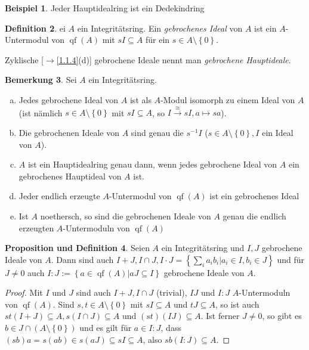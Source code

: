 \documentclass[
twoside=semi,
fontsize=12,
DIV=12, 
cleardoublepage=current,
leqno,
headings=optiontoheadandtoc, 
toc=idx
]{scrbook}
\newcommand{\set}[1]{\left\{ #1 \right\}}
\DeclareMathOperator{\qf}{qf}
\theoremstyle{definition}
\newtheorem{definition}{Definition}[section]
\newtheorem{bemerkung}[definition]{Bemerkung}
\newtheorem{beispiel}[definition]{Beispiel}
\newtheorem{prop-def}[definition]{Proposition und Definition}
\begin{document}
 	\begin{beispiel}\label{2.2.5}
 		Jeder Hauptidealring ist ein Dedekindring
 	\end{beispiel}
 
 	\begin{definition}\label{2.2.6}
 		ei $A$ ein Integrit\"atsring. Ein \emph{gebrochenes Ideal} von $A$ ist ein $A$-Untermodul von $\qf(A)$ mit $sI \subseteq A$ f\"ur ein $s \in A\setminus\set{0}$.
 		
 		Zyklische [$\to$\ref{1.1.4}(d)] gebrochene Ideale nennt man \emph{gebrochene Hauptideale}.
 	\end{definition}
 
 	\begin{bemerkung}\label{2.2.7}
 		Sei $A$ ein Integrit\"atsring.
 		\begin{enumerate}[(a)]
 			\item Jedes gebrochene Ideal von $A$ ist als $A$-Modul isomorph zu einem Ideal von $A$ (ist n\"amlich $s \in A \setminus \set{0}$ mit $sI \subseteq A$, so $I \xrightarrow{\cong} sI, a\mapsto sa$).
 			\item  Die gebrochenen Ideale von $A$ sind genau die $s^{-1}I$ ($s \in A \setminus \set{0}, I$ ein Ideal von $A$).
 			\item $A$ ist ein Hauptidealring genau dann, wenn jedes gebrochene Ideal von $A$ ein gebrochenes Hauptideal von $A$ ist.
 			\item Jeder endlich erzeugte $A$-Untermodul von $\qf(A)$ ist ein gebrochenes Ideal
 			\item Ist $A$ noethersch, so sind die gebrochenen Ideale von $A$ genau die endlich erzeugten $A$-Untermoduln von $\qf(A)$
 		\end{enumerate}
 	\end{bemerkung}
 
 	\begin{prop-def}\label{2.2.8}
 		Seien $A$ ein Integrit\"atsring und $I, J$ gebrochene Ideale von $A$. Dann sind auch $I+J, I \cap J, I \cdot J = \set{\sum_{i}a_ib_i|a_i \in I, b_i \in J}$ und f\"ur $J \neq 0$ auch 
 		$I:J := \set{a \in \qf(A)| aJ \subseteq I}$ gebrochene Ideale von $A$.
 		
 		\begin{proof}
 			Mit $I$ und $J$ sind auch $I + J, I \cap J$ (trivial), $IJ$ und $I:J$ $A$-Untermoduln von $\qf(A)$. Sind $s,t \in A \setminus \set{0}$ mit $sI \subseteq A$ und $tJ \subseteq A$, so ist auch $st(I+J) \subseteq A, s(I \cap J)\subseteq A$ und $(st)(IJ) \subseteq A$. Ist ferner $J \neq 0$, so gibt es $b \in J \cap (A \setminus \set{0})$ und es gilt f\"ur $a \in I:J$, dass $(sb)a = s(ab) \in s(aJ)\subseteq sI \subseteq A$, also $sb(I:J) \subseteq A$.
 		\end{proof}
 	\end{prop-def}
 
\end{document}
